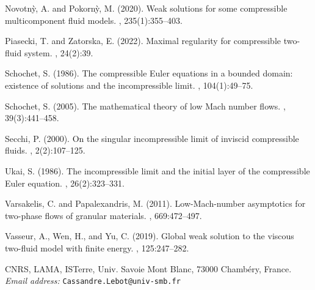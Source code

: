 \documentclass[11pt, twoside, a4paper]{article}
\makeatletter
\theoremstyle{plain}
\theoremstyle{remark}
\numberwithin{equation}{section}
\def\adrese{
\noindent CNRS, LAMA, ISTerre, Univ. Savoie Mont Blanc, 73000 Chamb\'ery, France.\\
{\it Email address:}
\texttt{Cassandre.Lebot@univ-smb.fr}
}
\makeatother
\begin{document}
\begin{thebibliography}{}
Novotn{\`y}, A. and Pokorn{\`y}, M. (2020).
\newblock Weak solutions for some compressible multicomponent fluid models.
, 235(1):355--403.

Piasecki, T. and Zatorska, E. (2022).
\newblock Maximal regularity for compressible two-fluid system.
, 24(2):39.

Schochet, S. (1986).
\newblock The compressible {E}uler equations in a bounded domain: existence of
  solutions and the incompressible limit.
, 104(1):49--75.

Schochet, S. (2005).
\newblock The mathematical theory of low {M}ach number flows.
, 39(3):441--458.

Secchi, P. (2000).
\newblock On the singular incompressible limit of inviscid compressible fluids.
, 2(2):107--125.

Ukai, S. (1986).
\newblock The incompressible limit and the initial layer of the compressible
  {E}uler equation.
, 26(2):323--331.

Varsakelis, C. and Papalexandris, M. (2011).
\newblock Low-{M}ach-number asymptotics for two-phase flows of granular
  materials.
, 669:472--497.

Vasseur, A., Wen, H., and Yu, C. (2019).
\newblock Global weak solution to the viscous two-fluid model with finite
  energy.
, 125:247--282.

\end{thebibliography}


\adrese
\end{document}
